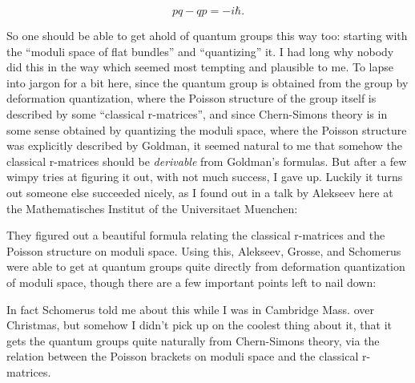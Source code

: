 \documentclass{article}
\def\tightlist{}
\renewcommand{\texttt}[1]{%
  \begingroup
  \ttfamily
  \begingroup\lccode`~=`/\lowercase{\endgroup\def~}{/\discretionary{}{}{}}%
  \begingroup\lccode`~=`[\lowercase{\endgroup\def~}{[\discretionary{}{}{}}%
  \begingroup\lccode`~=`.\lowercase{\endgroup\def~}{.\discretionary{}{}{}}%
  \catcode`/=\active\catcode`[=\active\catcode`.=\active
  \scantokens{#1\noexpand}%
  \endgroup
}
\begin{document}
\[pq - qp = -i \hbar.\]

So one should be able to get ahold of quantum groups this way too:
starting with the ``moduli space of flat bundles'' and ``quantizing''
it. I had long why nobody did this in the way which seemed most tempting
and plausible to me. To lapse into jargon for a bit here, since the
quantum group is obtained from the group by deformation quantization,
where the Poisson structure of the group itself is described by some
``classical r-matrices'', and since Chern-Simons theory is in some sense
obtained by quantizing the moduli space, where the Poisson structure was
explicitly described by Goldman, it seemed natural to me that somehow
the classical r-matrices should be \emph{derivable} from Goldman's
formulas. But after a few wimpy tries at figuring it out, with not much
success, I gave up. Luckily it turns out someone else succeeded nicely,
as I found out in a talk by Alekseev here at the Mathematisches Institut
of the Universitaet Muenchen:


They figured out a beautiful formula relating the classical r-matrices
and the Poisson structure on moduli space. Using this, Alekseev, Grosse,
and Schomerus were able to get at quantum groups quite directly from
deformation quantization of moduli space, though there are a few
important points left to nail down:


In fact Schomerus told me about this while I was in Cambridge Mass. over
Christmas, but somehow I didn't pick up on the coolest thing about it,
that it gets the quantum groups quite naturally from Chern-Simons
theory, via the relation between the Poisson brackets on moduli space
and the classical r-matrices.
\end{document}

